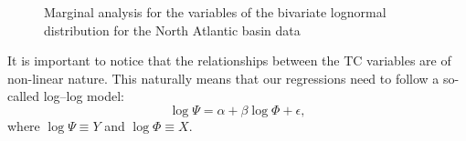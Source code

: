 
\begin{block}{\vspace*{1.6cm}}
	\begin{figure}[H]
		\centering
		\caption{Marginal analysis for the variables of the bivariate lognormal distribution for the North Atlantic basin data}
		\label{fig:natl-marginals}
	\end{figure}

	It is important to notice that the relationships between the TC variables are of non-linear nature. This naturally means that our regressions need to follow a so-called log--log model:
	\begin{equation}\label{eq:lm-model-bis}
		\log \Psi = \alpha + \beta \log \Phi + \epsilon ,
	\end{equation}
	where $\log \Psi \equiv Y$ and $\log \Phi \equiv X$.

\end{block}

